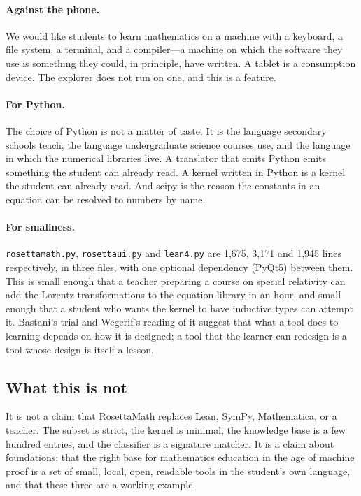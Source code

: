 \documentclass[11pt]{article}
\begin{document}
\paragraph{Against the phone.} We would like students to learn mathematics on
a machine with a keyboard, a file system, a terminal, and a compiler---a
machine on which the software they use is something they could, in principle,
have written. A tablet is a consumption device. The explorer does not run on
one, and this is a feature.

\paragraph{For Python.} The choice of Python is not a matter of taste. It is
the language secondary schools teach, the language undergraduate science
courses use, and the language in which the numerical libraries live. A
translator that emits Python emits something the student can already read.
A kernel written in Python is a kernel the student can already read. And
scipy is the reason the constants in an equation can be resolved to numbers by
name.

\paragraph{For smallness.} \texttt{rosettamath.py}, \texttt{rosettaui.py} and
\texttt{lean4.py} are 1,675, 3,171 and 1,945 lines respectively, in three
files, with one optional dependency (PyQt5) between them. This is small enough
that a teacher preparing a course on special relativity can add the Lorentz
transformations to the equation library in an hour, and small enough that a
student who wants the kernel to have inductive types can attempt it. Bastani's
trial \cite{bastani2025} and Wegerif's reading of it \cite{wegerif2026} suggest
that what a tool does to learning depends on how it is designed; a tool that the
learner can redesign is a tool whose design is itself a lesson.

\subsection{What this is not}

It is not a claim that RosettaMath replaces Lean, SymPy, Mathematica, or a
teacher. The subset is strict, the kernel is minimal, the knowledge base is a
few hundred entries, and the classifier is a signature matcher. It is a claim
about foundations: that the right base for mathematics education in the age of
machine proof is a set of small, local, open, readable tools in the student's
own language, and that these three are a working example.
\end{document}
